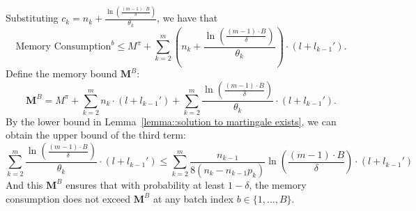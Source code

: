 Substituting \(c_k = n_k + \frac{\ln\left( \frac{(m - 1) \cdot B}{\delta} \right)}{\theta_k} \), we have that
$$    \text{Memory Consumption}^b \leq M^{\pi} + \sum_{k=2}^m \left( n_k + \frac{\ln\left( \frac{(m - 1) \cdot B}{\delta} \right)}{\theta_k} \right) \cdot (l + l_{k-1}').$$
Define the memory bound \( \mathbf{M}^B \):
$$\mathbf{M}^B = M^{\pi} + \sum_{k=2}^m n_k \cdot (l + l_{k-1}') + \sum_{k=2}^m \frac{\ln\left( \frac{(m - 1) \cdot B}{\delta} \right)}{\theta_k} \cdot (l + l_{k-1}').$$
By the lower bound in Lemma~\ref{lemma::solution to martingale exists}, we can obtain the upper bound of the third term:
$$\sum_{k=2}^m \frac{\ln\left( \frac{(m - 1) \cdot B}{\delta} \right)}{\theta_k} \cdot (l + l_{k-1}') \leq \sum_{k=2}^m \frac{n_{k-1}}{8(n_k - n_{k-1}p_k)}\ln\left( \frac{(m - 1) \cdot B}{\delta} \right)\cdot (l + l_{k-1}')$$
And this \( \mathbf{M}^B \) ensures that with probability at least \( 1 - \delta \), the memory consumption does not exceed \( \mathbf{M}^B \) at any batch index \( b \in \{1, \dots, B\} \).
